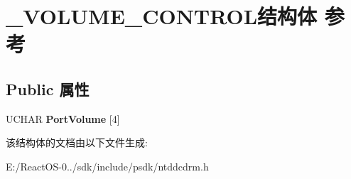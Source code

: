 \hypertarget{struct___v_o_l_u_m_e___c_o_n_t_r_o_l}{}\section{\+\_\+\+V\+O\+L\+U\+M\+E\+\_\+\+C\+O\+N\+T\+R\+O\+L结构体 参考}
\label{struct___v_o_l_u_m_e___c_o_n_t_r_o_l}
\subsection*{Public 属性}
\begin{DoxyCompactItemize}
\item 
\mbox{\label{struct___v_o_l_u_m_e___c_o_n_t_r_o_l_a58b4a84ba969581aad801805d2f6de8b}} 
U\+C\+H\+AR {\bfseries Port\+Volume} \mbox{[}4\mbox{]}
\end{DoxyCompactItemize}


该结构体的文档由以下文件生成\+:\begin{DoxyCompactItemize}
\item 
E\+:/\+React\+O\+S-\/0../sdk/include/psdk/ntddcdrm.\+h\end{DoxyCompactItemize}
